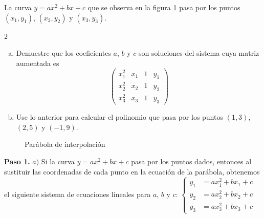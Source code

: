 \begin{example}
La curva $y=ax^2+bx+c$ que se observa en la figura \ref{parabolainterpolacion} pasa por los puntos $(x_1,y_1)$, $(x_2,y_2)$ y $(x_3,y_3)$.

\begin{multicols}{2}


\begin{enumerate}[a)]
\item Demuestre que los coeficientes $a$, $b$ y $c$ son soluciones del sistema cuya matriz aumentada es 
\[ \left( \begin{array}{ccc|c} 
x_1^2 & x_1 & 1 & y_1\\
x_2^2 & x_2 & 1 & y_2\\
x_3^2 & x_3 & 1 & y_3
\end{array} \right) \]

\item Use lo anterior para calcular el polinomio que pasa por los puntos $(1,3)$, $(2,5)$ y $(-1,9)$.
\end{enumerate}

\begin{figure}[H]
\centering
{}
\caption{Parábola de interpolación}\label{parabolainterpolacion}
\end{figure}
\end{multicols}
\begin{myproof}
\textbf{Paso 1.} $a)$ Si la curva $y=ax^2+bx+c$ pasa por los puntos dados, entonces al sustituir las coordenadas de cada punto en la ecuación de la parábola, obtenemos el siguiente sistema de ecuaciones lineales para $a$, $b$ y $c$: $
\begin{cases}
y_1 &= ax_1^2 + bx_1 + c\\
y_2 &= ax_2^2 + bx_2 + c\\
y_3 &= ax_3^2 + bx_3 + c
\end{cases}$


\end{myproof}
\end{example}
